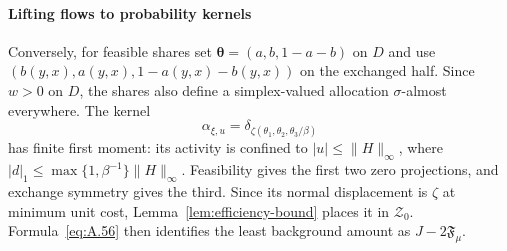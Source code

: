 \paragraph{Lifting flows to probability kernels}\label{par:flow-lift}
Conversely, for feasible shares set \(\boldsymbol\theta=(a,b,1-a-b)\) on \(D\) and use \((b(y,x),a(y,x),1-a(y,x)-b(y,x))\) on the exchanged half. Since \(w>0\) on \(D\), the shares also define a simplex-valued allocation \(\sigma\)-almost everywhere. The kernel
\begin{equation}
\alpha_{\xi,u}=\delta_{\zeta(\theta_1,\theta_2,\theta_3/\beta)}
\tag{A.57}\label{eq:A.57}
\end{equation}
has finite first moment: its activity is confined to \(|u|\le\|H\|_\infty\), where \(|d|_1\le\max\{1,\beta^{-1}\}\|H\|_\infty\). Feasibility gives the first two zero projections, and exchange symmetry gives the third. Since its normal displacement is \(\zeta\) at minimum unit cost, Lemma~\ref{lem:efficiency-bound} places it in \(\mathcal Z_0\). Formula~\eqref{eq:A.56} then identifies the least background amount as \(J-2\mathfrak F_\mu\).

